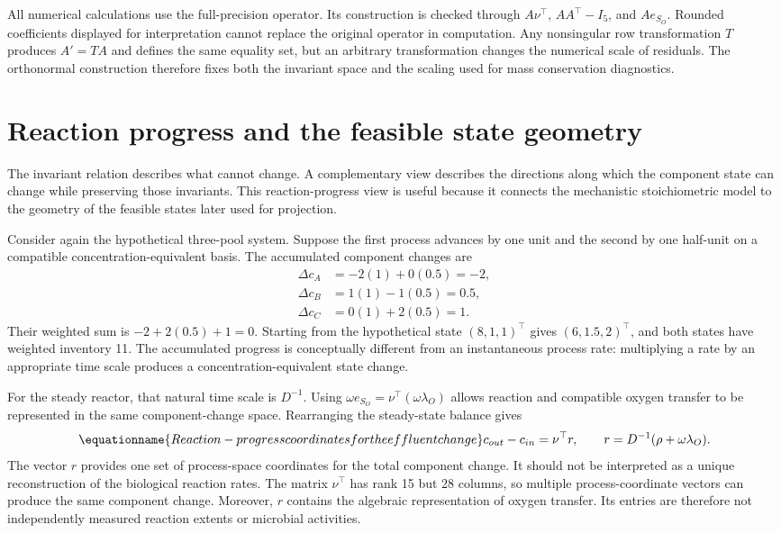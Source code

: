 All numerical calculations use the full-precision operator. Its construction is checked through $A\nu^\top$, $AA^\top-I_5$, and $Ae_{S_O}$. Rounded coefficients displayed for interpretation cannot replace the original operator in computation. Any nonsingular row transformation $T$ produces $A'=TA$ and defines the same equality set, but an arbitrary transformation changes the numerical scale of residuals. The orthonormal construction therefore fixes both the invariant space and the scaling used for mass conservation diagnostics.

\section{Reaction progress and the feasible state geometry}

The invariant relation describes what cannot change. A complementary view describes the directions along which the component state can change while preserving those invariants. This reaction-progress view is useful because it connects the mechanistic stoichiometric model to the geometry of the feasible states later used for projection.

Consider again the hypothetical three-pool system. Suppose the first process advances by one unit and the second by one half-unit on a compatible concentration-equivalent basis. The accumulated component changes are
\[
\begin{aligned}
\Delta c_A&=-2(1)+0(0.5)=-2,\\
\Delta c_B&=1(1)-1(0.5)=0.5,\\
\Delta c_C&=0(1)+2(0.5)=1.
\end{aligned}
\]
Their weighted sum is $-2+2(0.5)+1=0$. Starting from the hypothetical state $(8,1,1)^\top$ gives $(6,1.5,2)^\top$, and both states have weighted inventory 11. The accumulated progress is conceptually different from an instantaneous process rate: multiplying a rate by an appropriate time scale produces a concentration-equivalent state change.

For the steady reactor, that natural time scale is $D^{-1}$. Using
$\omega e_{S_O}=\nu^\top(\omega\lambda_O)$ allows reaction and compatible oxygen transfer to be represented in the same component-change space. Rearranging the steady-state balance gives
\begin{equation}
\equationname{Reaction-progress coordinates for the effluent change}
c_{out}-c_{in}=\nu^\top r,\qquad
r=D^{-1}(\rho+\omega\lambda_O).
\label{eq:reaction_progress_coordinates}
\end{equation}
The vector $r$ provides one set of process-space coordinates for the total component change. It should not be interpreted as a unique reconstruction of the biological reaction rates. The matrix $\nu^\top$ has rank 15 but 28 columns, so multiple process-coordinate vectors can produce the same component change. Moreover, $r$ contains the algebraic representation of oxygen transfer. Its entries are therefore not independently measured reaction extents or microbial activities.

